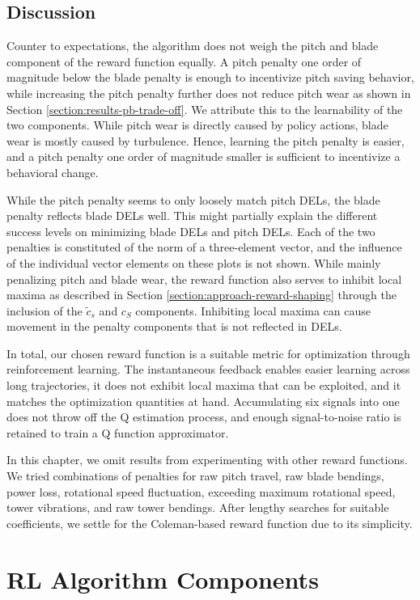 \subsection{Discussion}

Counter to expectations, the algorithm does not weigh the pitch and blade component of the reward function equally. A pitch penalty one order of magnitude below the blade penalty is enough to incentivize pitch saving behavior, while increasing the pitch penalty further does not reduce pitch wear as shown in Section \ref{section:results-pb-trade-off}. We attribute this to the learnability of the two components. While pitch wear is directly caused by policy actions, blade wear is mostly caused by turbulence. Hence, learning the pitch penalty is easier, and a pitch penalty one order of magnitude smaller is sufficient to incentivize a behavioral change.

While the pitch penalty seems to only loosely match pitch DELs, the blade penalty reflects blade DELs well. This might partially explain the different success levels on minimizing blade DELs and pitch DELs. Each of the two penalties is constituted of the norm of a three-element vector, and the influence of the individual vector elements on these plots is not shown. While mainly penalizing pitch and blade wear, the reward function also serves to inhibit local maxima as described in Section \ref{section:approach-reward-shaping} through the inclusion of the $\tilde c_s$ and $c_S$ components. Inhibiting local maxima can cause movement in the penalty components that is not reflected in DELs. 

In total, our chosen reward function is a suitable metric for optimization through reinforcement learning. The instantaneous feedback enables easier learning across long trajectories, it does not exhibit local maxima that can be exploited, and it matches the optimization quantities at hand. Accumulating six signals into one does not throw off the Q estimation process, and enough signal-to-noise ratio is retained to train a Q function approximator.

In this chapter, we omit results from experimenting with other reward functions. We tried combinations of penalties for raw pitch travel, raw blade bendings, power loss, rotational speed fluctuation, exceeding maximum rotational speed, tower vibrations, and raw tower bendings. After lengthy searches for suitable coefficients, we settle for the Coleman-based reward function due to its simplicity.

\section{RL Algorithm Components}
\label{section:results-rl-components}

